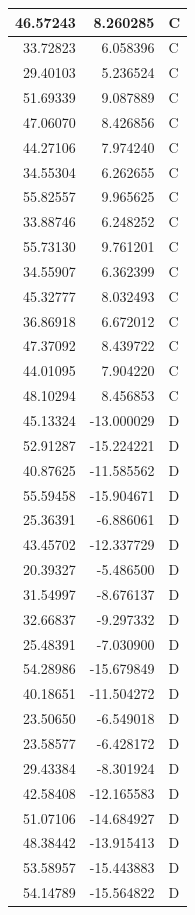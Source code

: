 \documentclass[
  letterpaper,
  DIV=11,
  numbers=noendperiod]{scrartcl}
\begin{document}
\begin{table}
\begin{tabular}[t]{r|r|l}
\hline
46.57243 & 8.260285 & C\\
\hline
33.72823 & 6.058396 & C\\
\hline
29.40103 & 5.236524 & C\\
\hline
51.69339 & 9.087889 & C\\
\hline
47.06070 & 8.426856 & C\\
\hline
44.27106 & 7.974240 & C\\
\hline
34.55304 & 6.262655 & C\\
\hline
55.82557 & 9.965625 & C\\
\hline
33.88746 & 6.248252 & C\\
\hline
55.73130 & 9.761201 & C\\
\hline
34.55907 & 6.362399 & C\\
\hline
45.32777 & 8.032493 & C\\
\hline
36.86918 & 6.672012 & C\\
\hline
47.37092 & 8.439722 & C\\
\hline
44.01095 & 7.904220 & C\\
\hline
48.10294 & 8.456853 & C\\
\hline
45.13324 & -13.000029 & D\\
\hline
52.91287 & -15.224221 & D\\
\hline
40.87625 & -11.585562 & D\\
\hline
55.59458 & -15.904671 & D\\
\hline
25.36391 & -6.886061 & D\\
\hline
43.45702 & -12.337729 & D\\
\hline
20.39327 & -5.486500 & D\\
\hline
31.54997 & -8.676137 & D\\
\hline
32.66837 & -9.297332 & D\\
\hline
25.48391 & -7.030900 & D\\
\hline
54.28986 & -15.679849 & D\\
\hline
40.18651 & -11.504272 & D\\
\hline
23.50650 & -6.549018 & D\\
\hline
23.58577 & -6.428172 & D\\
\hline
29.43384 & -8.301924 & D\\
\hline
42.58408 & -12.165583 & D\\
\hline
51.07106 & -14.684927 & D\\
\hline
48.38442 & -13.915413 & D\\
\hline
53.58957 & -15.443883 & D\\
\hline
54.14789 & -15.564822 & D\\

\end{tabular}
\end{table}
\end{document}
